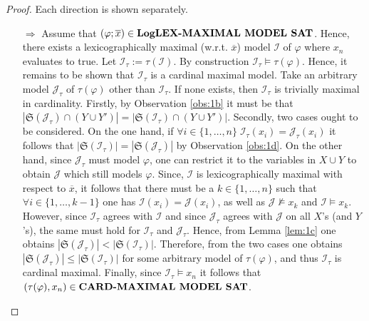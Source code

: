 \documentclass [11pt]{article}
\newcommand{\MAXCARDSAT}{\mbox{\bf CARD-MAXIMAL MODEL SAT}}
\newcommand{\LogMAXLEXSAT}{\mbox{\bf LogLEX-MAXIMAL MODEL SAT}}
\newcommand{\nmodels}{\not\models}
\begin{document}
\begin{proof}
Each direction is shown separately. 
\begin{itemize}
\item[$\Rightarrow$] Assume that $(\varphi;\overline{x}) \in \LogMAXLEXSAT $.  Hence, there exists a lexicographically maximal (w.r.t. $\overline{x}$) model $\mathcal{I}$ of $\varphi$ where $x_n$ evaluates to true. 
Let $\mathcal{I}_{\tau}:=\tau(\mathcal{I})$. By construction $\mathcal{I}_{\tau} \models \tau(\varphi)$. Hence, it remains to be shown that $\mathcal{I}_{\tau}$ is a cardinal maximal 
model. Take an arbitrary model $\mathcal{J}_{\tau}$ of $\tau(\varphi)$ other than $\mathcal{I}_{\tau}$. If none exists, then $\mathcal{I}_{\tau}$ is trivially maximal in cardinality. Firstly, by Observation \ref{obs:1b} it must be that
$|\mathfrak{S}(\mathcal{J}_{\tau}) \cap (Y \cup Y')|=|\mathfrak{S}(\mathcal{I}_{\tau}) \cap (Y \cup Y')|$.
Secondly, 
 two cases ought to be considered. On the one hand, if $\forall i \in \{1, \dots , n\}\; \mathcal{I}_{\tau}(x_i)=\mathcal{J}_{\tau}(x_i)$ it follows that $|\mathfrak{S}(\mathcal{I}_{\tau})|=|\mathfrak{S}(\mathcal{J}_{\tau})|$ by Observation \ref{obs:1d}. On the other hand, since $\mathcal{J}_{\tau}$ must model $\varphi$, one can restrict it to the variables in $X \cup Y$ to obtain $\mathcal{J}$ which still models $\varphi$. Since, $\mathcal{I}$ is lexicographically maximal with respect to $\overline{x}$, it follows that there must be a $k \in \{1, \dots , n \}$ such that $\forall i \in  \{1, \dots , k-1 \}$ one has $\mathcal{I}(x_i)=\mathcal{J}(x_i)$, as well as  $\mathcal{J} \nmodels x_k$ and $\mathcal{I} \models x_k$. However, since $\mathcal{I}_{\tau}$ agrees with $\mathcal{I}$ and since $\mathcal{J}_{\tau}$ agrees with $\mathcal{J}$ on all $X$'s (and $Y$'s), the same must hold for $\mathcal{I}_{\tau}$ and $\mathcal{J}_{\tau}$. Hence, from Lemma \ref{lem:1c} one obtains $|\mathfrak{S}(\mathcal{J}_{\tau})| < |\mathfrak{S}(\mathcal{I}_{\tau}) |$. Therefore, from the two cases one obtains $|\mathfrak{S}(\mathcal{J}_{\tau})|\leq |\mathfrak{S}(\mathcal{I}_{\tau}) |$ for some arbitrary model of $\tau(\varphi)$, and thus $\mathcal{I}_{\tau}$ is cardinal maximal. Finally, since $\mathcal{I}_{\tau} \models x_n$ it follows that $(\tau(\varphi), x_n) \in \MAXCARDSAT$.

\end{itemize}
\end{proof}
\end{document}
